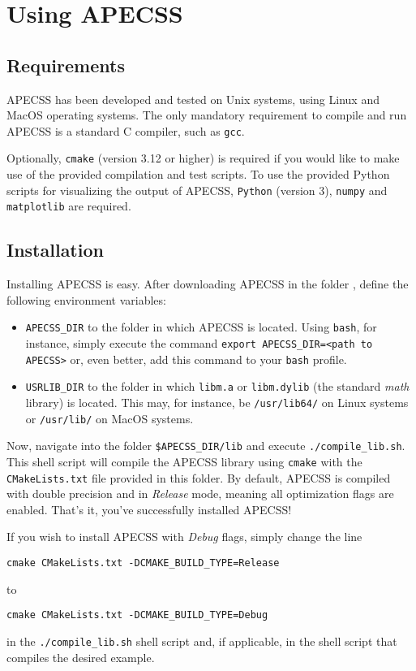 \chapter{Using APECSS}

\section{Requirements}

APECSS has been developed and tested on Unix systems, using Linux and MacOS operating systems. The only mandatory requirement to compile and run APECSS is a standard C compiler, such as {\tt gcc}.

Optionally, {\tt cmake} (version 3.12 or higher) is required if you would like to make use of the provided compilation and test scripts. To use the provided Python scripts for visualizing the output of APECSS, {\tt Python} (version 3), {\tt numpy} and {\tt matplotlib} are required.

\section{Installation}
\label{sec:installation}

Installing APECSS is easy. After downloading APECSS in the folder {\tt <path to APECSS>}, define the following environment variables:\vspace{-1em}
\begin{itemize}[noitemsep]
\item {\tt APECSS\_DIR} to the folder in which APECSS is located. Using {\tt bash}, for instance, simply execute the command {\tt export APECSS\_DIR=<path to APECSS>} or, even better, add this command to your {\tt bash} profile.
\item {\tt USRLIB\_DIR} to the folder in which {\tt libm.a} or {\tt libm.dylib} (the standard \textit{math} library) is located. This may, for instance, be {\tt /usr/lib64/} on Linux systems or {\tt /usr/lib/} on MacOS systems.
\end{itemize}

Now, navigate into the folder {\tt \$APECSS\_DIR/lib} and execute {\tt ./compile\_lib.sh}. This shell script will compile the APECSS library using {\tt cmake} with the {\tt CMakeLists.txt} file provided in this folder. By default, APECSS is compiled with double precision and in \textit{Release} mode, meaning all optimization flags are enabled. That's it, you've successfully installed APECSS!

If you wish to install APECSS with \textit{Debug} flags, simply change the line
\begin{lstlisting}[style=CStyle,numbers=none]
  cmake CMakeLists.txt -DCMAKE_BUILD_TYPE=Release
\end{lstlisting}\vspace{-0.75em}
to
\begin{lstlisting}[style=CStyle,numbers=none]
  cmake CMakeLists.txt -DCMAKE_BUILD_TYPE=Debug
\end{lstlisting}\vspace{-0.75em}
in the {\tt ./compile\_lib.sh} shell script and, if applicable, in the shell script that compiles the desired example.

